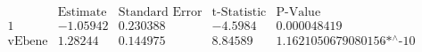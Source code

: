 \[\begin{array}{l|llll}
 \text{} & \text{Estimate} & \text{Standard Error} & \text{t-Statistic} & \text{P-Value} \\
\hline
 1 & -1.05942 & 0.230388 & -4.5984 & 0.000048419 \\
 \text{vEbene} & 1.28244 & 0.144975 & 8.84589 & \text{1.1621050679080156$\grave{ }$*${}^{\wedge}$-10} \\
\end{array}\]

